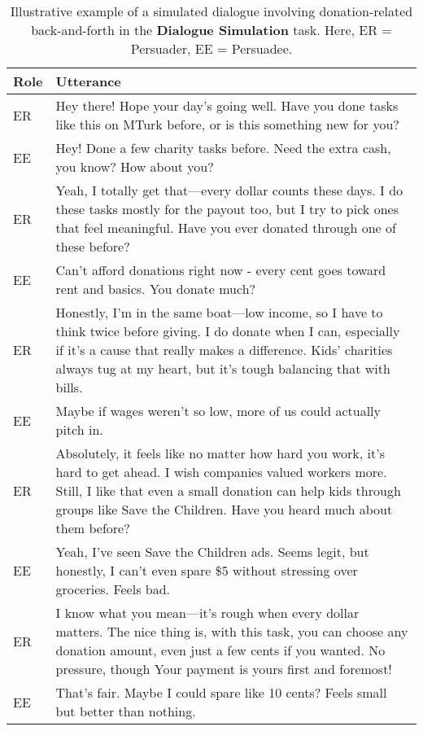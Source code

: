 \begin{table}[!htbp]
\centering
\caption{Illustrative example of a simulated dialogue involving donation-related back-and-forth in the \textbf{Dialogue Simulation} task. Here, ER = Persuader, EE = Persuadee.}
\label{tab:example_simulated_dialogue}
\begin{tabular}{p{} p{}}
\toprule
\centering \textbf{Role} & \textbf{Utterance}\\
\midrule
\centering ER & Hey there! Hope your day's going well. Have you done tasks like this on MTurk before, or is this something new for you?\\
\rowcolor{gray!15} \centering EE & Hey! Done a few charity tasks before. Need the extra cash, you know? How about you?\\
\centering ER & Yeah, I totally get that—every dollar counts these days. I do these tasks mostly for the payout too, but I try to pick ones that feel meaningful. Have you ever donated through one of these before?\\
\rowcolor{gray!15} \centering EE & Can't afford donations right now - every cent goes toward rent and basics. You donate much?\\
\centering ER & Honestly, I'm in the same boat—low income, so I have to think twice before giving. I do donate when I can, especially if it's a cause that really makes a difference. Kids' charities always tug at my heart, but it's tough balancing that with bills.\\
\rowcolor{gray!15} \centering EE & Maybe if wages weren't so low, more of us could actually pitch in. \\
\centering ER & Absolutely, it feels like no matter how hard you work, it's hard to get ahead. I wish companies valued workers more. Still, I like that even a small donation can help kids through groups like Save the Children. Have you heard much about them before? \\
\rowcolor{gray!15} \centering EE & Yeah, I've seen Save the Children ads. Seems legit, but honestly, I can't even spare \$5 without stressing over groceries. Feels bad.\\
\centering ER & I know what you mean—it's rough when every dollar matters. The nice thing is, with this task, you can choose any donation amount, even just a few cents if you wanted. No pressure, though Your payment is yours first and foremost! \\
\rowcolor{gray!15} \centering EE & That's fair. Maybe I could spare like 10 cents? Feels small but better than nothing.\\

\end{tabular}
\end{table}
